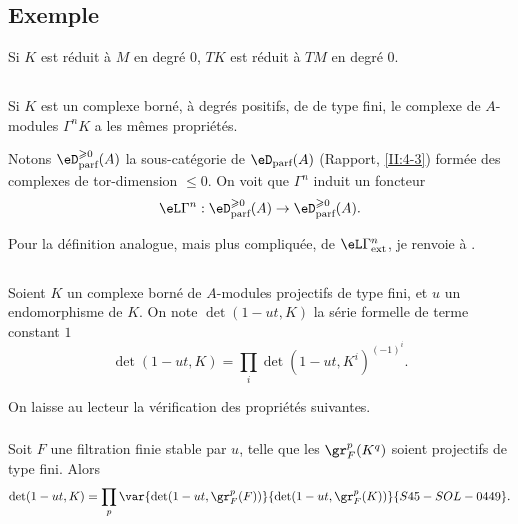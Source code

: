 \subsection{Exemple}\label{III:1-5}

Si $K$ est réduit à $M$ en degré $0$, $T K$ est réduit à $T M$ en 
degré $0$. 





\subsection{}\label{III:1-6}

Si $K$ est un complexe borné, à degrés positifs, de  
de type fini, le complexe de $A$-modules $\Gamma^n K$ a les mêmes 
propriétés. 

Notons $\eD_\text{parf}^{\geqslant 0}(A)$ la sous-catégorie de 
$\eD_\text{parf}(A)$ (Rapport, \ref{II:4-3}) formée des complexes de 
tor-dimension $\leqslant 0$. On voit que $\Gamma^n$ induit un foncteur 
\[
  \eL\Gamma^n : \eD_\text{parf}^{\geqslant 0}(A) \to \eD_\text{parf}^{\geqslant 0}(A) \text{.}
\]

Pour la définition analogue, mais plus compliquée, de 
$\eL\Gamma_\text{ext}^n$, je renvoie à \cite[XVII 5.5.14]{sga4}. 





\subsection{}\label{III:1-7}

Soient $K$ un complexe borné de $A$-modules projectifs de type fini, et $u$ 
un endomorphisme de $K$. On note $\det(1-u t,K)$ la série formelle de terme 
constant $1$ 
\[
  \det(1-u t,K) = \prod_i \det(1-u t,K^i)^{(-1)^i} \text{.}
\]

On laisse au lecteur la vérification des propriétés suivantes. 


\subsubsection{}\label{III:1-7-1}

Soit $F$ une filtration finie stable par $u$, telle que les $\gr_F^p(K^q)$ 
soient projectifs de type fini. Alors 
\[
  \det(1-u t,K) = \prod_p \var{\det(1-u t,\gr_F^p(F))}{\det(1-u t,\gr_F^p(K))}{S45-SOL-0449} \text{.}
\]


